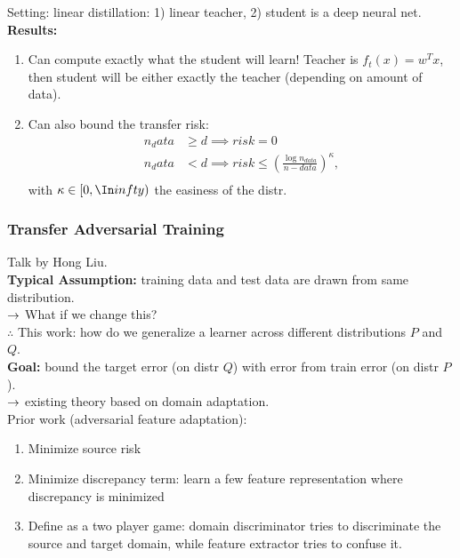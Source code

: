 Setting: linear distillation: 1) linear teacher, 2) student is a deep neural net. \\

{\bf Results:}
\begin{enumerate}
    \item Can compute exactly what the student will learn! Teacher is $f_t(x) = w^T x$, then student will be either exactly the teacher (depending on amount of data).
    \item Can also bound the transfer risk:
    \begin{align}
        n_data &\geq d \implies risk = 0 \\
        n_data &< d \implies risk \leq \left(\frac{\log n_{data}}{n-data}\right)^\kappa, \\
    \end{align}
    with $\kappa \in [0,\In infty)$ the easiness of the distr.
\end{enumerate}

\spacerule

\subsubsection{Transfer Adversarial Training}

Talk by Hong Liu. \\

{\bf Typical Assumption:} training data and test data are drawn from same distribution. \\

$\rightarrow$ What if we change this? \\

$\therefore$ This work: how do we generalize a learner across different distributions $P$ and $Q$. \\

{\bf Goal:} bound the target error (on distr $Q$) with error from train error (on distr $P$). \\

$\rightarrow$ existing theory based on domain adaptation. \\

Prior work (adversarial feature adaptation):
\begin{enumerate}
    \item Minimize source risk
    \item Minimize discrepancy term: learn a few feature representation where discrepancy is minimized
    \item Define as a two player game: domain discriminator tries to discriminate the source and target domain, while feature extractor tries to confuse it.
\end{enumerate}

